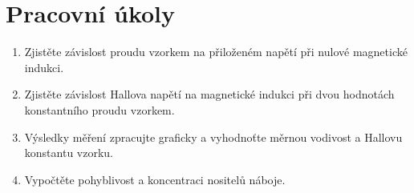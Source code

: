 \documentclass[a4paper]{article}
\author{Vladislav Wohlrath}
\begin{document}
\begin{titlepage}

\end{titlepage}

\section*{Pracovní úkoly}
\begin{enumerate}
\item Zjistěte závislost proudu vzorkem na přiloženém napětí při nulové magnetické indukci.
\item Zjistěte závislost Hallova napětí na magnetické indukci při dvou hodnotách konstantního proudu vzorkem.
\item Výsledky měření zpracujte graficky a vyhodnoťte měrnou vodivost a Hallovu konstantu vzorku.
\item Vypočtěte pohyblivost a koncentraci nositelů náboje.
\end{enumerate}










\printbibliography[title={Seznam použité literatury}]
\end{document}
